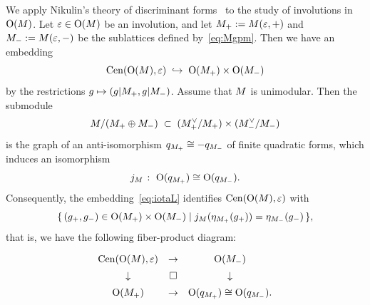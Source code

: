 \documentclass{amsart} %
\begin{document}
%
We apply 
Nikulin's theory of discriminant forms~\cite{MR525944}
to the study of involutions in $\mathord{\mathrm{O}}(M)$.
Let $\varepsilon \in \mathord{\mathrm{O}}(M)$ be an involution, 
and let
$M_+:=M(\varepsilon,+)$ and
$M_-:=M(\varepsilon,-)$
be the sublattices defined by~\eqref{eq:Mgpm}.
Then we have an embedding
%
\begin{equation}\label{eq:iotaL}
\mathrm{Cen}(\mathord{\mathrm{O}}(M), \varepsilon)\;\hookrightarrow\; \mathord{\mathrm{O}}(M_+)\times \mathord{\mathrm{O}}(M_-)
\end{equation}
%
by the restrictions $g\mapsto (g|M_+, g|M_-)$.
Assume that $M$ is unimodular.
Then the submodule
\[
M/(M_+\oplus M_-) \;\subset\; (M_+^{\vee}/M_+)\times (M_-^{\vee}/M_-)
\]
is the graph of an anti-isomorphism
$q_{M_+} \cong -q_{M_-}$
of finite quadratic forms,
which 
induces an isomorphism
\[
j_M\;\colon\; \mathord{\mathrm{O}}(q_{M_+}) \cong \mathord{\mathrm{O}}(q_{M_-}).
\]
Consequently, the embedding~\eqref{eq:iotaL} identifies
$\mathrm{Cen}(\mathord{\mathrm{O}}(M),\varepsilon)$ with
%
\begin{equation*}\label{eq:CenL}
\{\,{(g_{+}, g_{-})\in \mathord{\mathrm{O}}(M_+)\times \mathord{\mathrm{O}}(M_-)}\mid {j_M(\eta_{M_+}(g_{+}))=\eta_{M_-}(g_{-})} \,\},
\end{equation*}
%
that is, we have the following fiber-product diagram:
%
\begin{equation}\label{eq:groupfibprodCenvep}
\renewcommand{\arraystretch}{1.4}
\begin{array}{ccc}
\Cen(\OG(\dLat), \vep) &\to & \OG(\dLatminus) \\
\downarrow & \square& \downarrow \\
\OG(\dLatplus) & \to & \OG(q_{\dLatplus}) \cong \OG(q_{\dLatminus}).
\end{array}
\end{equation}
%
%
\end{document}
